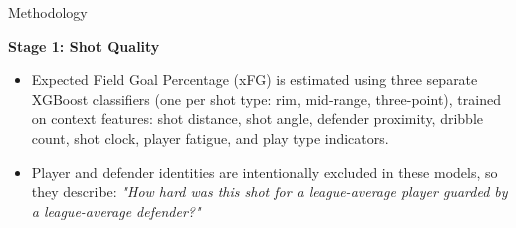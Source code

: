 \documentclass[final]{beamer}
\newlength{\onecolwid}
\begin{document}
\begin{frame}[t]
\begin{columns}[t]
\begin{column}{\onecolwid}
% 
% 
% 
% 
% 
% 
% 
% 
% 






\begin{block}{Methodology}

\textbf{Stage 1: Shot Quality} \\[0.5ex]
\begin{itemize}
\item Expected Field Goal Percentage (xFG) is estimated using three separate XGBoost classifiers (one per shot type: rim, mid-range, three-point), trained on context features: shot distance, shot angle, defender proximity, dribble count, shot clock, player fatigue, and play type indicators.
\item Player and defender identities are intentionally excluded in these models, so they describe: \textit{"How hard was this shot for a league-average player guarded by a league-average defender?"}
\end{itemize}


\end{block}
\end{column}
\end{columns}
\end{frame}
\end{document}
